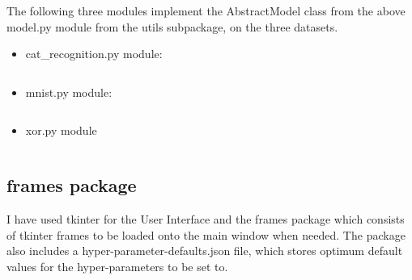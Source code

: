 \documentclass[./project-report/src/latex/project-report.tex]{subfiles}
\begin{document}
The following three modules implement the AbstractModel class from the above model.py module from the utils subpackage, on the three datasets.

\begin{itemize}
    \item cat\_recognition.py module:
        \inputminted{python}{./school_project/models/cpu/cat_recognition.py}
    \item mnist.py module:
        \inputminted{python}{./school_project/models/cpu/mnist.py}
    \item xor.py module
        \inputminted{python}{./school_project/models/cpu/xor.py}
\end{itemize}

\subsection{frames package}

I have used tkinter for the User Interface and the frames package which consists of tkinter frames to be loaded onto the main window when needed. The package also 
includes a hyper-parameter-defaults.json file, which stores optimum default values for the hyper-parameters to be set to.
\end{document}
